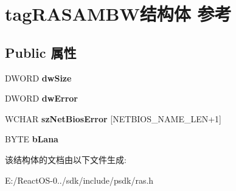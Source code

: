 \hypertarget{structtag_r_a_s_a_m_b_w}{}\section{tag\+R\+A\+S\+A\+M\+B\+W结构体 参考}
\label{structtag_r_a_s_a_m_b_w}
\subsection*{Public 属性}
\begin{DoxyCompactItemize}
\item 
\mbox{\label{structtag_r_a_s_a_m_b_w_a7f058210f064eb5aa7941c393fe26a3b}} 
D\+W\+O\+RD {\bfseries dw\+Size}
\item 
\mbox{\label{structtag_r_a_s_a_m_b_w_af208d0409dbea069523dd22d6a4a3f2e}} 
D\+W\+O\+RD {\bfseries dw\+Error}
\item 
\mbox{\label{structtag_r_a_s_a_m_b_w_a9a2f6395f871643a409e66c2980e6aa6}} 
W\+C\+H\+AR {\bfseries sz\+Net\+Bios\+Error} \mbox{[}N\+E\+T\+B\+I\+O\+S\+\_\+\+N\+A\+M\+E\+\_\+\+L\+EN+1\mbox{]}
\item 
\mbox{\label{structtag_r_a_s_a_m_b_w_ae018248c9481127a41bbf0471e4dad2d}} 
B\+Y\+TE {\bfseries b\+Lana}
\end{DoxyCompactItemize}


该结构体的文档由以下文件生成\+:\begin{DoxyCompactItemize}
\item 
E\+:/\+React\+O\+S-\/0../sdk/include/psdk/ras.\+h\end{DoxyCompactItemize}
